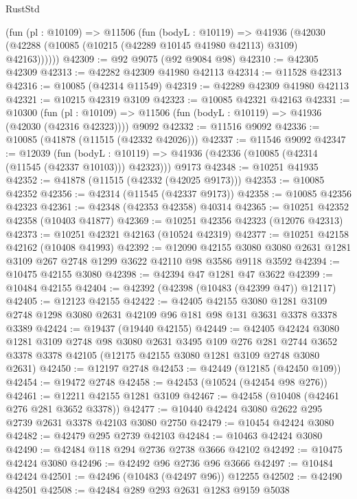 \begin{lexlean}{RustStd}
\begin{coremodule}
      (fun (pl : @10109) =>
      @11506
        (fun (bodyL : @10119) =>
        @41936 (@42030 (@42288 (@10085 (@10215 (@42289 @10145 @41980 @42113) @3109) @42163))))))
@42309 := @92 @9075 (@92 @9084 @98)
@42310 := @42305 @42309
@42313 := @42282 @42309 @41980 @42113
@42314 := @11528 @42313
@42316 := @10085 (@42314 @11549)
@42319 := @42289 @42309 @41980 @42113
@42321 := @10215 @42319 @3109
@42323 := @10085 @42321 @42163
@42331 := @10300
    (fun (pl : @10109) => @11506 (fun (bodyL : @10119) => @41936 (@42030 (@42316 @42323))))
    @9092
@42332 := @11516 @9092
@42336 := @10085 (@41878 (@11515 (@42332 @42026)))
@42337 := @11546 @9092
@42347 := @12039
    (fun (bodyL : @10119) => @41936 (@42336 (@10085 (@42314 (@11545 (@42337 @10103))) @42323)))
    @9173
@42348 := @10251 @41935
@42352 := @41878 (@11515 (@42332 (@42025 @9173)))
@42353 := @10085 @42352
@42356 := @42314 (@11545 (@42337 @9173))
@42358 := @10085 @42356 @42323
@42361 := @42348 (@42353 @42358) @40314
@42365 := @10251 @42352 @42358 (@10403 @41877)
@42369 := @10251 @42356 @42323 (@12076 @42313)
@42373 := @10251 @42321 @42163 (@10524 @42319)
@42377 := @10251 @42158 @42162 (@10408 @41993)
@42392 := @12090
    @42155
    @3080
    @3080
    @2631
    @1281
    @3109
    @267
    @2748
    @1299
    @3622
    @42110
    @98
    @3586
    @9118
    @3592
@42394 := @10475 @42155 @3080
@42398 := @42394 @47 @1281 @47 @3622
@42399 := @10484 @42155
@42404 := @42392 (@42398 (@10483 (@42399 @47)) @12117)
@42405 := @12123 @42155
@42422 := @42405
    @42155
    @3080
    @1281
    @3109
    @2748
    @1298
    @3080
    @2631
    @42109
    @96
    @181
    @98
    @131
    @3631
    @3378
    @3378
    @3389
@42424 := @19437 (@19440 @42155)
@42449 := @42405
    @42424
    @3080
    @1281
    @3109
    @2748
    @98
    @3080
    @2631
    @3495
    @109
    @276
    @281
    @2744
    @3652
    @3378
    @3378
    @42105
    (@12175 @42155 @3080 @1281 @3109 @2748 @3080 @2631)
@42450 := @12197 @2748
@42453 := @42449 (@12185 (@42450 @109))
@42454 := @19472 @2748
@42458 := @42453 (@10524 (@42454 @98 @276))
@42461 := @12211 @42155 @1281 @3109
@42467 := @42458 (@10408 (@42461 @276 @281 @3652 @3378))
@42477 := @10440 @42424 @3080 @2622 @295 @2739 @2631 @3378 @42103 @3080 @2750
@42479 := @10454 @42424 @3080
@42482 := @42479 @295 @2739 @42103
@42484 := @10463 @42424 @3080
@42490 := @42484 @118 @294 @2736 @2738 @3666 @42102
@42492 := @10475 @42424 @3080
@42496 := @42492 @96 @2736 @96 @3666
@42497 := @10484 @42424
@42501 := @42496 (@10483 (@42497 @96)) @12255
@42502 := @42490 @42501
@42508 := @42484 @289 @293 @2631 @1283 @9159 @5038

\end{coremodule}
\end{lexlean}
